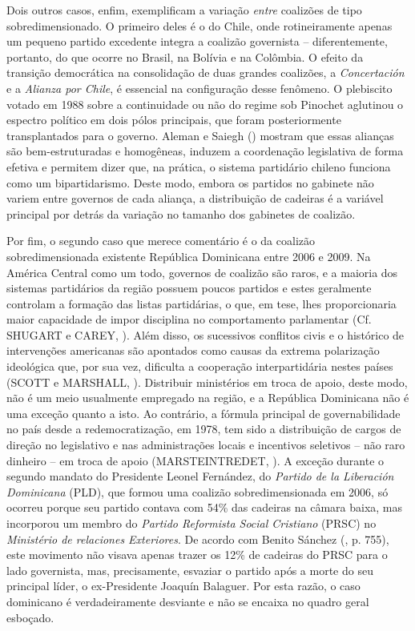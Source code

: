 Dois outros casos, enfim, exemplificam a variação \textit{entre} coalizões de tipo sobredimensionado. O primeiro deles é o do Chile, onde rotineiramente apenas um pequeno partido excedente integra a coalizão governista -- diferentemente, portanto, do que ocorre no Brasil, na Bolívia e na Colômbia. O efeito da transição democrática na consolidação de duas grandes coalizões, a \textit{Concertación} e a \textit{Alianza por Chile}, é essencial na configuração desse fenômeno. O plebiscito votado em 1988 sobre a continuidade ou não do regime sob Pinochet aglutinou o espectro político em dois pólos principais, que foram posteriormente transplantados para o governo. Aleman e Saiegh (\citeyear{aleman2007}) mostram que essas alianças são bem-estruturadas e homogêneas, induzem a coordenação legislativa de forma efetiva e permitem dizer que, na prática, o sistema partidário chileno funciona como um bipartidarismo. Deste modo, embora os partidos no gabinete não variem entre governos de cada aliança, a distribuição de cadeiras é a variável principal por detrás da variação no tamanho dos gabinetes de coalizão.

Por fim, o segundo caso que merece comentário é o da coalizão sobredimensionada existente República Dominicana entre 2006 e 2009. Na América Central como um todo, governos de coalizão são raros, e a maioria dos sistemas partidários da região possuem poucos partidos e estes geralmente controlam a formação das listas partidárias, o que, em tese, lhes proporcionaria maior capacidade de impor disciplina no comportamento parlamentar (Cf. SHUGART e CAREY, \citeyear{shugart1992}). Além disso, os sucessivos conflitos civis e o histórico de intervenções americanas são apontados como causas da extrema polarização ideológica que, por sua vez, dificulta a cooperação interpartidária nestes países (SCOTT e MARSHALL, \citeyear{scott1998}). Distribuir ministérios em troca de apoio, deste modo, não é um meio usualmente empregado na região, e a República Dominicana não é uma exceção quanto a isto. Ao contrário, a fórmula principal de governabilidade no país desde a redemocratização, em 1978, tem sido a distribuição de cargos de direção no legislativo e nas administrações locais e incentivos seletivos -- não raro dinheiro -- em troca de apoio (MARSTEINTREDET, \citeyear{mars2008}). A exceção durante o segundo mandato do Presidente Leonel Fernández, do \textit{Partido de la Liberación Dominicana} (PLD), que formou uma coalizão sobredimensionada em 2006, só ocorreu porque seu partido contava com 54\% das cadeiras na câmara baixa, mas incorporou um membro do \textit{Partido Reformista Social Cristiano} (PRSC) no \textit{Ministério de relaciones Exteriores}. De acordo com Benito Sánchez (\citeyear{benito2010}, p. 755), este movimento não visava apenas trazer os 12\% de cadeiras do PRSC para o lado governista, mas, precisamente, esvaziar o partido após a morte do seu principal líder, o ex-Presidente Joaquín Balaguer. Por esta razão, o caso dominicano é verdadeiramente desviante e não se encaixa no quadro geral esboçado.



